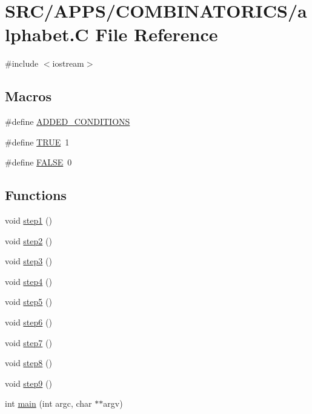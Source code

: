 \hypertarget{alphabet_8_c}{}\section{S\+R\+C/\+A\+P\+P\+S/\+C\+O\+M\+B\+I\+N\+A\+T\+O\+R\+I\+C\+S/alphabet.C File Reference}
\label{alphabet_8_c}
{\ttfamily \#include $<$iostream$>$}\newline
\subsection*{Macros}
\begin{DoxyCompactItemize}
\item 
\#define \mbox{\hyperlink{alphabet_8_c_aa00aed9e058cf99dc60d3dd633377e4c}{A\+D\+D\+E\+D\+\_\+\+C\+O\+N\+D\+I\+T\+I\+O\+NS}}
\item 
\#define \mbox{\hyperlink{alphabet_8_c_aa8cecfc5c5c054d2875c03e77b7be15d}{T\+R\+UE}}~1
\item 
\#define \mbox{\hyperlink{alphabet_8_c_aa93f0eb578d23995850d61f7d61c55c1}{F\+A\+L\+SE}}~0
\end{DoxyCompactItemize}
\subsection*{Functions}
\begin{DoxyCompactItemize}
\item 
void \mbox{\hyperlink{alphabet_8_c_a3a49c788d5af77e40bd11fa8a58e3aad}{step1}} ()
\item 
void \mbox{\hyperlink{alphabet_8_c_af8e85ed40687e598dd13d12f16f9f91f}{step2}} ()
\item 
void \mbox{\hyperlink{alphabet_8_c_a398da9deea29d9ee8737f7ac2c69c1ff}{step3}} ()
\item 
void \mbox{\hyperlink{alphabet_8_c_a0d2923306f849e222a939be42d0766f4}{step4}} ()
\item 
void \mbox{\hyperlink{alphabet_8_c_a7cd71333196d90783e0de62c4fa49aa6}{step5}} ()
\item 
void \mbox{\hyperlink{alphabet_8_c_a818d2a75aa35872731fc29c2bdc28a15}{step6}} ()
\item 
void \mbox{\hyperlink{alphabet_8_c_ab8e6c007fd00864128c789dcbb7431d6}{step7}} ()
\item 
void \mbox{\hyperlink{alphabet_8_c_ac956094a7e2e4c7381a221557cb3c820}{step8}} ()
\item 
void \mbox{\hyperlink{alphabet_8_c_a23e5e69193b86fbfe05b8fad607861d8}{step9}} ()
\item 
int \mbox{\hyperlink{alphabet_8_c_a3c04138a5bfe5d72780bb7e82a18e627}{main}} (int argc, char $\ast$$\ast$argv)
\end{DoxyCompactItemize}
